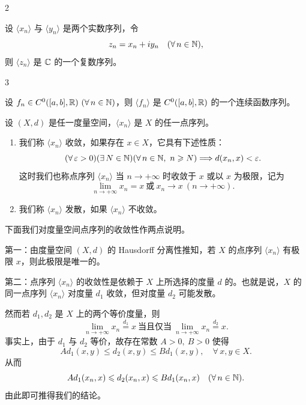 \begin{sourceexample}{2}

设 $\langle x_n\rangle$ 与 $\langle y_n\rangle$ 是两个实数序列，令
\[z_n=x_n+iy_n\quad(\forall\,n\in\mathbb{N}),\]
则 $\langle z_n\rangle$ 是 $\mathbb{C}$ 的一个复数序列。

\end{sourceexample}

\begin{sourceexample}{3}

设 $f_n\in C^0([a,b],\R)\ (\forall\,n\in\N)$，则 $\langle f_n\rangle$ 是 $C^0([a,b],\mathbb{R})$ 的一个连续函数序列。

\end{sourceexample}

\begin{mydef*}{}

设 $(X,d)$ 是任一度量空间，$\langle x_n\rangle$ 是 $X$ 的任一点序列。

\begin{enumerate}[label=\arabic{enumi})]
\item 我们称 $\langle x_n\rangle$ 收敛，如果存在 $x\in X$，它具有下述性质：
\[(\forall\,\varepsilon>0)(\exists\,N\in\N)(\forall\,n\in\N,\ n\geqslant N)\Longrightarrow d(x_n,x)<\varepsilon.\]
这时我们也称点序列 $\langle x_n\rangle$ 当 $n\to+\infty$ 时收敛于 $x$ 或以 $x$ 为极限，记为
\[\lim_{n\to+\infty}x_n=x\ \text{或}\ x_n\to x\ (n\to+\infty).\]
\item 我们称 $\langle x_n\rangle$ 发散，如果 $\langle x_n\rangle$ 不收敛。
\end{enumerate}

\end{mydef*}

下面我们对度量空间点序列的收敛性作两点说明。

第一：由度量空间 $(X,d)$ 的 Hausdorff 分离性推知，若 $X$ 的点序列 $\langle x_n\rangle$ 有极限 $x$，则此极限是唯一的。

第二：点序列 $\langle x_n\rangle$ 的收敛性是依赖于 $X$ 上所选择的度量 $d$ 的。也就是说，$X$ 的同一点序列 $\langle x_n\rangle$ 对度量 $d_1$ 收敛，但对度量 $d_2$ 可能发散。

然而若 $d_1,d_2$ 是 $X$ 上的两个等价度量，则
\[\lim_{n\to+\infty}x_n\stackrel{d_1}{=}x\ \text{当且仅当}\ \lim_{n\to+\infty}x_n\stackrel{d_2}{=}x.\]
事实上，由于 $d_1$ 与 $d_2$ 等价，故存在常数 $A>0,\ B>0$ 使得
\[Ad_1(x,y)\leqslant d_2(x,y)\leqslant Bd_1(x,y),\quad\forall\,x,y\in X.\]
从而
\[Ad_1(x_n,x)\leqslant d_2(x_n,x)\leqslant Bd_1(x_n,x)\quad(\forall\,n\in\mathbb{N}).\]
由此即可推得我们的结论。

